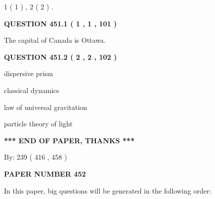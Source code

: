 \documentclass[12pt]{article}
\begin{document}
   
   1 ( 1 )
 ,
   2 ( 2 )
 .
  
\vspace{0.2in}
  
{\textbf{\Large{QUESTION
451.1 
 ( 1 , 1 , 101 )
}}}
  
  
 
 
\noindent{}
 
 
The capital of Canada is Ottawa.
 
 
 
 
  
\vspace{0.2in}
  
{\textbf{\Large{QUESTION
451.2 
 ( 2 , 2 , 102 )
}}}
  
  
 
 
\noindent{}
 
 
dispersive prism
 
 
classical dynamics
 
 
law of universal gravitation
 
 
particle theory of light
 
 
 
 
   
   
\vspace{1.0in} 
{\textbf{\large{ *** END OF PAPER, THANKS *** }}} 
   
   
\hspace{1.0in} By: 
 239 ( 416 ,  458 )
   
   
   
   
\newpage 
\setcounter{page}{ 
   452001 } 
   
   
   
   
 {\textbf{ \Large{ PAPER NUMBER  452  }}}
   
   
\vspace{0.2in}
   
   
   
   
   
\vspace{0.2in}
   
In this paper, big questions will be generated in the following order: 
   
\end{document}
